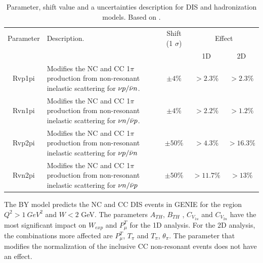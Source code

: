 \begin{table}[!htb]
    \centering
    \begin{tabular}{c|p{2.2in}|c|c|c}
        \hline 
        Parameter & Description.  & Shift (1 $\sigma$) & \multicolumn{2}{c}{Effect} \\
         & & & 1D & 2D \\
        \hline  
        Rvp1pi & Modifies the NC and CC 1$\pi$ production from non-resonant inelastic scattering for $\nu p/\Bar{\nu}n$. & $\pm4\%$ & $>2.3\%$ & $>2.3\%$\\ \hline
        Rvn1pi & Modifies the NC and CC 1$\pi$ production from non-resonant inelastic scattering for $\nu n/\Bar{\nu}p$. & $\pm4\%$ & $>2.2\%$ & $>1.2\%$\\ \hline
        Rvp2pi & Modifies the NC and CC 1$\pi$ production from non-resonant inelastic scattering for $\nu p/\Bar{\nu}n$ & $\pm50\%$ & $>4.3\%$ & $>16.3\%$\\ \hline
        Rvn2pi & Modifies the NC and CC 1$\pi$ production from non-resonant inelastic scattering for $\nu n/\Bar{\nu}p$ & $\pm50\%$ & $>11.7\%$ & $>13\%$\\ \hline
         
    \end{tabular}
    \caption{Parameter, shift value and a uncertainties description for DIS and hadronization models. Based on \cite{GENIEUnc}.}
    \label{tab:ErrorAnalysis:SystematicUnc:GenieNonRES}
\end{table}


The BY model predicts the NC and CC DIS events in GENIE for the region $Q^2 > 1\ GeV^2$ and $W<2$ GeV. The parameters $A_{TH}$, $B_{TH}$ , $C_{V_{1u}}$ and $C_{V_{2u}}$ have the most significant impact on $W_{exp}$ and $P^T_\mu$ for the 1D analysis. For the 2D analysis, the combinations more affected are $P^T_\mu$, $T_\pi$ and $T_\pi$, $\theta_\pi$. The parameter that modifies the normalization of the inclusive CC non-resonant events does not have an effect.

